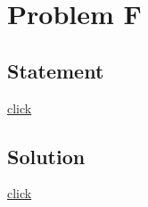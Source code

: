 \section{Problem F}
    \subsection{Statement}
        {\color{blue} \href{http://hsin.hr/coci/archive/2006_2007/contest2_tasks.pdf}{click}}

    \subsection{Solution}
        {\color{blue} \href{http://hsin.hr/coci/archive/2006_2007/contest2_solutions.zip}{click}}
